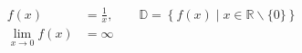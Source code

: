 \documentclass[12pt,a5paper]{book}
\begin{document}
\begin{align}
f(x) &= \frac{1}{x} ,\qquad \mathbb{D} = \left\{ f(x) \mid x \in \mathbb{R} \backslash \{ 0 \} \right\} \\
\lim\limits_{x \to 0} f(x) &= \infty
\end{align}
\end{document}
